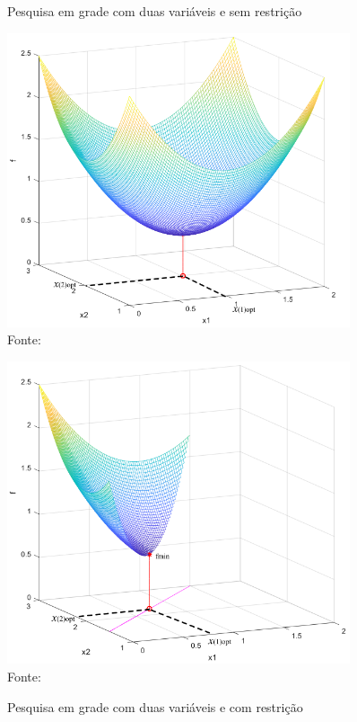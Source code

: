 \begin{figure}[h]
    \centering
    \begin{minipage}{0.45\textwidth}
		\caption{Pesquisa em grade com duas variáveis e sem restrição}
        \centering
        \includegraphics[width=0.9\textwidth]{./5_images/fig_grid_search_vectorial1.png} 
		\label{fig:grid_search_vectorial_nobounds}
		Fonte: 
    \end{minipage}\hfill
    \begin{minipage}{0.45\textwidth}
		\caption{Pesquisa em grade com duas variáveis e com restrição}  
        \centering
        \includegraphics[width=0.9\textwidth]{./5_images/fig_grid_search_vectorial2.png} 
		\label{fig:grid_search_vectorial_withbounds}		      
		Fonte: 
	\end{minipage}
\end{figure}

